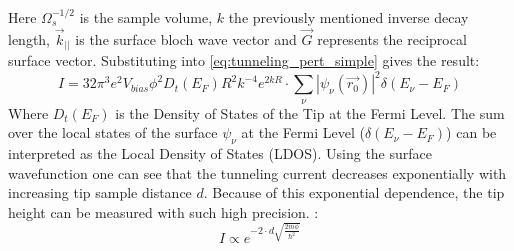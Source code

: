Here $\Omega_{s}^{-1/2}$ is the sample volume, $k$ the previously mentioned inverse decay length, $\vec{k}_{||}$ is the surface bloch wave vector and $\vec{G}$ represents the reciprocal surface vector.
Substituting into \ref{eq:tunneling_pert_simple} gives the result:
\begin{equation}
    I = 32 \pi^3e^2 V_{bias}\phi^2 D_t(E_F)R^2 k^{-4} e^{2kR} \cdot \sum_{\nu} |\psi_{\nu}(\vec{r_0})|^2 \delta(E_{\nu} - E_F) 
\end{equation}
Where $D_t(E_F)$ is the Density of States of the Tip at the Fermi Level. 
The sum over the local states of the surface $\psi_{\nu}$ at the Fermi Level ($\delta(E_{\nu} - E_F)$) can be interpreted as the Local Density of States (LDOS).
Using the surface wavefunction one can see that the tunneling current decreases exponentially with increasing tip sample distance $d$.
Because of this exponential dependence, the tip height can be measured with such high precision. :
\begin{equation}
    I \varpropto e^{-2 \cdot d \sqrt{\frac{2m \phi}{\hbar^2}}}
    \label{eq:propcurrent}
\end{equation}




\newpage

